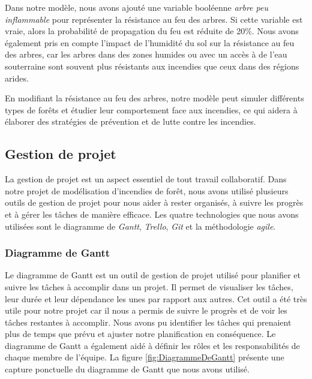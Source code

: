 Dans notre modèle, nous avons ajouté une variable booléenne \textit{arbre peu inflammable} pour représenter la résistance au feu des arbres. Si cette variable est vraie, alors la probabilité de propagation du feu est réduite de 20\%. Nous avons également pris en compte l'impact de l'humidité du sol sur la résistance au feu des arbres, car les arbres dans des zones humides ou avec un accès à de l'eau souterraine sont souvent plus résistants aux incendies que ceux dans des régions arides. 

En modifiant la résistance au feu des arbres, notre modèle peut simuler différents types de forêts et étudier leur comportement face aux incendies, ce qui aidera à élaborer des stratégies de prévention et de lutte contre les incendies.

\subsection{Gestion de projet}

La gestion de projet est un aspect essentiel de tout travail collaboratif. Dans notre projet de modélisation d'incendies de forêt, nous avons utilisé plusieurs outils de gestion de projet pour nous aider à rester organisés, à suivre les progrès et à gérer les tâches de manière efficace. Les quatre technologies que nous avons utilisées sont le diagramme de \textit{Gantt}, \textit{Trello}, \textit{Git} et la méthodologie \textit{agile}.

\subsubsection{Diagramme de Gantt}

Le diagramme de Gantt est un outil de gestion de projet utilisé pour planifier et suivre les tâches à accomplir dans un projet. Il permet de visualiser les tâches, leur durée et leur dépendance les unes par rapport aux autres. Cet outil a été très utile pour notre projet car il nous a permis de suivre le progrès et de voir les tâches restantes à accomplir. Nous avons pu identifier les tâches qui prenaient plus de temps que prévu et ajuster notre planification en conséquence. Le diagramme de Gantt a également aidé à définir les rôles et les responsabilités de chaque membre de l'équipe. La figure \ref{fig:DiagrammeDeGantt} présente une capture ponctuelle du diagramme de Gantt que nous avons utilisé.


